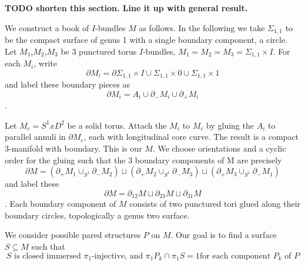 \documentclass[12pt]{amsart}
\theoremstyle{definition}
\theoremstyle{remark}
\newcommand{\x}{\times}
\newcommand{\bd}{\partial}
\newcommand{\Si}{\Sigma}
\newcommand{\cin}{\subseteq}
\begin{document}
{\bf TODO shorten this section. Line it up with general result.}

We construct a book of $I$-bundles $M$ as follows. In the following we take
$\Si_{1,1}$ to be the compact surface of genus 1 with a single boundary
component, a circle. Let $M_1$,$M_2$,$M_3$ be 3 punctured torus $I$-bundles,
$M_1=M_2=M_3=\Si_{1,1}\x I$. For each $M_i$, write \[ \bd M_i = \bd \Si_{1,1}\x
I \cup \Si_{1,1}\x0 \cup \Si_{1,1} \x 1 \] and label these boundary pieces as
\[ \bd M_i = A_i \cup \bd_- M_i \cup \bd_+M_i \].

Let $M_c = S^1xD^2$ be a solid torus. Attach the $M_i$ to $M_c$ by gluing the
$A_i$ to parallel annuli in $\bd M_c$, each with longitudinal core curve. The
result is a compact 3-manifold with boundary. This is our $M$. We choose
orientations and a cyclic order for the gluing such that the 3 boundary
components of M are precisely
\[
\bd M = (\bd_+M_1 \cup_{S^1} \bd_-M_2) \sqcup (\bd_+M_2 \cup_{S^1} \bd_-M_3)
\sqcup (\bd_+M_3 \cup_{S^1} \bd_-M_1)
\]
and label these
\[
\bd M=\bd_{12}M \sqcup \bd_{23}M \sqcup \bd_{31}M
\].
Each boundary
component of $M$ consists of two punctured tori glued along their boundary
circles, topologically a genus two surface.

We consider possible pared structures $P$ on $M$. Our goal is to find
a surface $S \cin M$ such that
\begin{equation}\label{E:qf}
S \text{ is closed immersed $\pi_1$-injective, and  $\pi_1P_k \cap \pi_1S
= 1$
for each component $P_k$ of $P$} \tag{\textasteriskcentered}
\end{equation}

%
\end{document}
